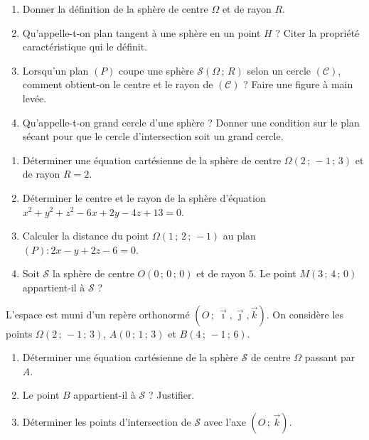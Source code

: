 \documentclass[11pt]{article}
\newcommand{\cle}[1]{{\popxbold\color{popdark}#1}}
\newcounter{popsec}
\newcounter{popsub}
\newcommand{\courssub}[1]{%
  \stepcounter{popsub}%
  \par\vspace{9pt}\noindent{\popxbold\fontsize{11.5}{13}\selectfont\color{popink}{\color{poporange}\thepopsec.\thepopsub}\hspace{6pt}#1}\par\nopagebreak\vspace{4pt}
}
\begin{document}
\begin{exercice}
\begin{enumerate}
\item Donner la définition de la sphère de centre $\Omega$ et de rayon $R$.
\item Qu'appelle-t-on \cle{plan tangent} à une sphère en un point $H$ ? Citer la propriété caractéristique qui le définit.
\item Lorsqu'un plan $(P)$ coupe une sphère $\mathcal{S}(\Omega\,;\,R)$ selon un cercle $(\mathcal{C})$, comment obtient-on le centre et le rayon de $(\mathcal{C})$ ? Faire une figure à main levée.
\item Qu'appelle-t-on \cle{grand cercle} d'une sphère ? Donner une condition sur le plan sécant pour que le cercle d'intersection soit un grand cercle.
\end{enumerate}
\end{exercice}

\begin{exercice}
\begin{enumerate}
\item Déterminer une équation cartésienne de la sphère de centre $\Omega(2\,;\,-1\,;\,3)$ et de rayon $R=2$.
\item Déterminer le centre et le rayon de la sphère d'équation $x^2+y^2+z^2-6x+2y-4z+13=0$.
\item Calculer la distance du point $\Omega(1\,;\,2\,;\,-1)$ au plan $(P) : 2x-y+2z-6=0$.
\item Soit $\mathcal{S}$ la sphère de centre $O(0\,;\,0\,;\,0)$ et de rayon $5$. Le point $M(3\,;\,4\,;\,0)$ appartient-il à $\mathcal{S}$ ?
\end{enumerate}
\end{exercice}

\courssub{Je m'entraîne}

\begin{exercice}
L'espace est muni d'un repère orthonormé $(O\,;\,\vec{\imath},\vec{\jmath},\vec{k})$. On considère les points $\Omega(2\,;\,-1\,;\,3)$, $A(0\,;\,1\,;\,3)$ et $B(4\,;\,-1\,;\,6)$.
\begin{enumerate}
\item Déterminer une équation cartésienne de la sphère $\mathcal{S}$ de centre $\Omega$ passant par $A$.
\item Le point $B$ appartient-il à $\mathcal{S}$ ? Justifier.
\item Déterminer les points d'intersection de $\mathcal{S}$ avec l'axe $(O\,;\,\vec{k})$.
\end{enumerate}
\end{exercice}
\end{document}
